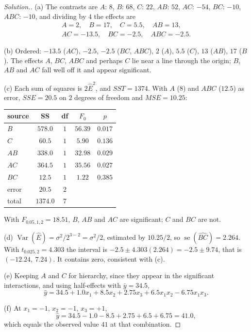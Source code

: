 \documentclass[11pt,a4paper]{article}
\numberwithin{equation}{section}
\DeclareMathOperator{\Var}{Var}
\theoremstyle{definition}
\newenvironment{solution}
  {\renewcommand{\qedsymbol}{}\begin{proof}[\textit{Solution}.]}
  {\end{proof}}
\begin{document}
\begin{solution}
(a) The contrasts are $A$: $8$, $B$: $68$, $C$: $22$, $AB$: $52$, $AC$: $-54$, $BC$: $-10$, $ABC$: $-10$, and dividing by $4$ the effects are
\begin{gather*}
A = 2 , \quad B = 17 , \quad C = 5.5 , \quad AB = 13 , \\
AC = -13.5 , \quad BC = -2.5 , \quad ABC = -2.5 .
\end{gather*}

(b) Ordered: $-13.5$ ($AC$), $-2.5$, $-2.5$ ($BC$, $ABC$), $2$ ($A$), $5.5$ ($C$), $13$ ($AB$), $17$ ($B$). The effects $A$, $BC$, $ABC$ and perhaps $C$ lie near a line through the
origin; $B$, $AB$ and $AC$ fall well off it and appear significant.

(c) Each sum of squares is $2\hat E^2$, and $SST = 1374$. With $A$ ($8$) and $ABC$ ($12.5$) as error, $SSE = 20.5$ on $2$ degrees of freedom and $MSE = 10.25$:
\begin{center}
\begin{tabular}{l|c|c|c|c}
source & SS & df & $F_0$ & $p$ \\
\hline
$B$ & $578.0$ & $1$ & $56.39$ & $0.017$ \\
$C$ & $60.5$ & $1$ & $5.90$ & $0.136$ \\
$AB$ & $338.0$ & $1$ & $32.98$ & $0.029$ \\
$AC$ & $364.5$ & $1$ & $35.56$ & $0.027$ \\
$BC$ & $12.5$ & $1$ & $1.22$ & $0.385$ \\
error & $20.5$ & $2$ & & \\
\hline
total & $1374.0$ & $7$ & &
\end{tabular}
\end{center}
With $F_{0.05,1,2} = 18.51$, $B$, $AB$ and $AC$ are significant; $C$ and $BC$ are not.

(d) $\Var(\hat E) = \sigma^2/2^{3-2} = \sigma^2/2$, estimated by $10.25/2$, so $\operatorname{se}(\widehat{BC}) = 2.264$. With $t_{0.025,2} = 4.303$ the interval is $-2.5 \pm 4.303(2.264) = -2.5 \pm 9.74$,
that is $(-12.24,\ 7.24)$. It contains zero, consistent with (c).

(e) Keeping $A$ and $C$ for hierarchy, since they appear in the significant interactions, and using half-effects with $\bar y = 34.5$,
\[
\hat y = 34.5 + 1.0x_1 + 8.5x_2 + 2.75x_3 + 6.5x_1x_2 - 6.75x_1x_3 .
\]

(f) At $x_1 = -1$, $x_2 = -1$, $x_3 = +1$,
\[
\hat y = 34.5 - 1.0 - 8.5 + 2.75 + 6.5 + 6.75 = 41.0 ,
\]
which equals the observed value $41$ at that combination.
\end{solution}
\end{document}
